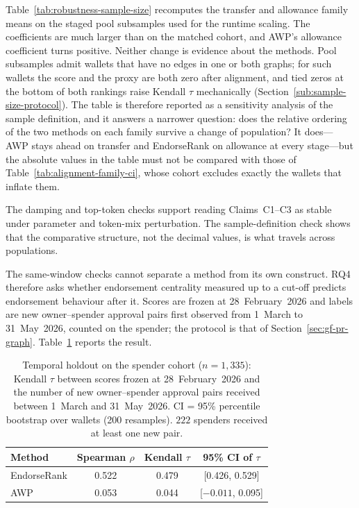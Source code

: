 


Table~\ref{tab:robustness-sample-size} recomputes the transfer and allowance family means on the staged pool subsamples used for the runtime scaling. The coefficients are much larger than on the matched cohort, and AWP's allowance coefficient turns positive. Neither change is evidence about the methods. Pool subsamples admit wallets that have no edges in one or both graphs; for such wallets the score and the proxy are both zero after alignment, and tied zeros at the bottom of both rankings raise Kendall $\tau$ mechanically (Section~\ref{sub:sample-size-protocol}). The table is therefore reported as a sensitivity analysis of the sample definition, and it answers a narrower question: does the relative ordering of the two methods on each family survive a change of population? It does---AWP stays ahead on transfer and EndorseRank on allowance at every stage---but the absolute values in the table must not be compared with those of Table~\ref{tab:alignment-family-ci}, whose cohort excludes exactly the wallets that inflate them.

The damping and top-token checks support reading Claims~C1--C3 as stable under parameter and token-mix perturbation. The sample-definition check shows that the comparative structure, not the decimal values, is what travels across populations.


The same-window checks cannot separate a method from its own construct. RQ4 therefore asks whether endorsement centrality measured up to a cut-off predicts endorsement behaviour after it. Scores are frozen at 28~February~2026 and labels are new owner--spender approval pairs first observed from 1~March to 31~May~2026, counted on the spender; the protocol is that of Section~\ref{sec:gf-pr-graph}. Table~\ref{tab:holdout-spenders} reports the result.

\begin{table}[htbp]
\centering
\caption{Temporal holdout on the spender cohort ($n=1{,}335$): Kendall $\tau$ between scores frozen at 28~February~2026 and the number of new owner--spender approval pairs received between 1~March and 31~May~2026. CI = 95\% percentile bootstrap over wallets (200 resamples). $222$ spenders received at least one new pair.}
\label{tab:holdout-spenders}
\begin{tabular}{lccc}
\toprule
Method & Spearman $\rho$ & Kendall $\tau$ & 95\% CI of $\tau$ \\
\midrule
EndorseRank & 0.522 & 0.479 & [0.426, 0.529] \\
AWP & 0.053 & 0.044 & [$-0.011$, 0.095] \\
\bottomrule
\end{tabular}
\end{table}


